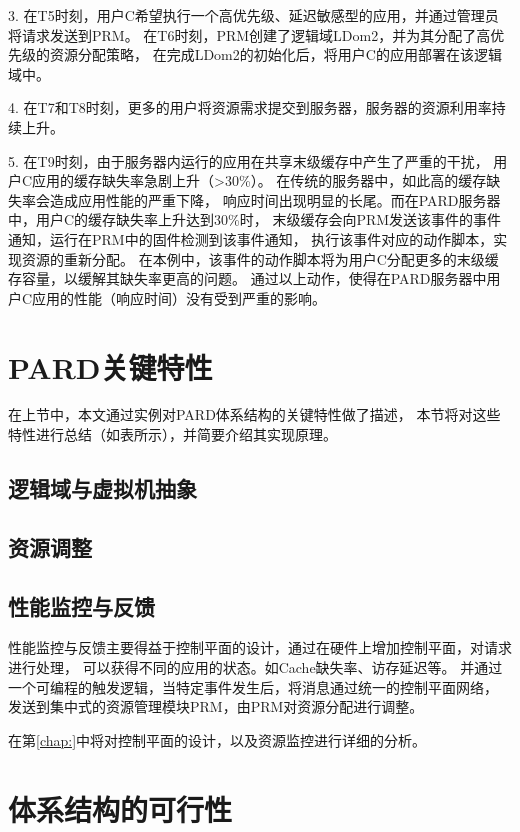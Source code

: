 3. 在T5时刻，用户C希望执行一个高优先级、延迟敏感型的应用，并通过管理员将请求发送到PRM。
在T6时刻，PRM创建了逻辑域LDom2，并为其分配了高优先级的资源分配策略，
在完成LDom2的初始化后，将用户C的应用部署在该逻辑域中。

4. 在T7和T8时刻，更多的用户将资源需求提交到服务器，服务器的资源利用率持续上升。

5. 在T9时刻，由于服务器内运行的应用在共享末级缓存中产生了严重的干扰，
用户C应用的缓存缺失率急剧上升（>30\%）。
在传统的服务器中，如此高的缓存缺失率会造成应用性能的严重下降，
响应时间出现明显的长尾。而在PARD服务器中，用户C的缓存缺失率上升达到30\%时，
末级缓存会向PRM发送该事件的事件通知，运行在PRM中的固件检测到该事件通知，
执行该事件对应的动作脚本，实现资源的重新分配。
在本例中，该事件的动作脚本将为用户C分配更多的末级缓存容量，以缓解其缺失率更高的问题。
通过以上动作，使得在PARD服务器中用户C应用的性能（响应时间）没有受到严重的影响。

\section{PARD关键特性}

在上节中，本文通过实例对PARD体系结构的关键特性做了描述，
本节将对这些特性进行总结（如表\cite{}所示），并简要介绍其实现原理。

\subsection{逻辑域与虚拟机抽象}


\subsection{资源调整}


\subsection{性能监控与反馈}

性能监控与反馈主要得益于控制平面的设计，通过在硬件上增加控制平面，对请求进行处理，
可以获得不同的应用的状态。如Cache缺失率、访存延迟等。
并通过一个可编程的触发逻辑，当特定事件发生后，将消息通过统一的控制平面网络，
发送到集中式的资源管理模块PRM，由PRM对资源分配进行调整。

在第\ref{chap:}中将对控制平面的设计，以及资源监控进行详细的分析。



\section{体系结构的可行性}

